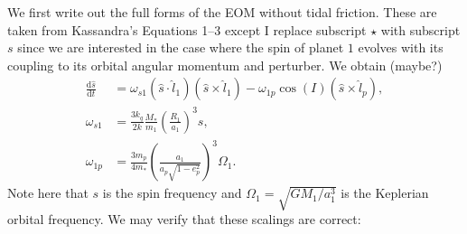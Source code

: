 \documentclass[11pt,
        usenames, %
        dvipsnames %
    ]{article}
\newcommand*{\rd}[2]{\frac{\mathrm{d}#1}{\mathrm{d}#2}}
\newcommand*{\p}[1]{\left(#1\right)}
\begin{document}
We first write out the full forms of the EOM without tidal friction. These are
taken from Kassandra's Equations 1--3 except I replace subscript $\star$ with
subscript $s$ since we are interested in the case where the spin of planet $1$
evolves with its coupling to its orbital angular momentum and perturber. We
obtain (maybe?)
\begin{align}
    \rd{\hat{s}}{t}
        &= \omega_{s1}\p{\hat{s} \cdot \hat{l}_1}\p{\hat{s} \times \hat{l}_1}
            - \omega_{1p}\cos(I)\p{\hat{s} \times \hat{l}_p},\\
    \omega_{s1} &= \frac{3k_q}{2k}\frac{M_*}{m_1}\p{\frac{R_1}{a_1}}^3 s,\\
    \omega_{1p} &= \frac{3m_p}{4m_*}\p{\frac{a_1}{a_p\sqrt{1 - e_p^2}}}^3 \Omega_1.
\end{align}
Note here that $s$ is the spin frequency and $\Omega_1 = \sqrt{GM_1/a_1^3}$ is
the Keplerian orbital frequency. We may verify that these scalings are correct:
\end{document}
